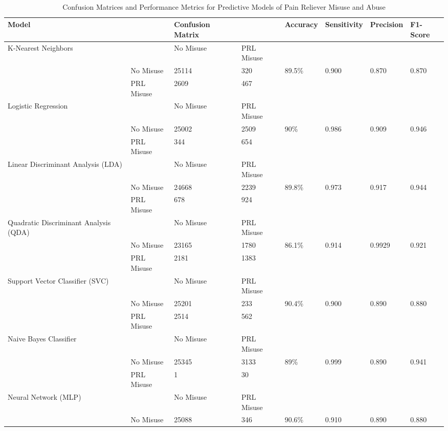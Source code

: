 \\\documentclass[sigconf]{acmart}
\begin{document}
 

 
 
\begin{table*}[ht]
  \caption{Confusion Matrices and Performance Metrics for Predictive Models of 
  Pain Reliever Misuse and Abuse}
  \label{tab:freq}
  \begin{tabular}{llllllll}
    \toprule
    Model& & Confusion Matrix & & Accuracy & Sensitivity & Precision & F1-Score \\
    \midrule
    K-Nearest Neighbors & & No Misuse & PRL Misuse &  &  &  & \\
     & No Misuse & 25114 & 320 & 89.5\% & 0.900 & 0.870 & 0.870 \\
     & PRL Misuse & 2609 & 467 &  &  &  & \\
    \midrule
    Logistic Regression & & No Misuse & PRL Misuse &  &  &  & \\
     & No Misuse & 25002 & 2509 & 90\% & 0.986 & 0.909 & 0.946 \\
     & PRL Misuse & 344 & 654 &  &  &  & \\
    \midrule
    Linear Discriminant Analysis (LDA) & & No Misuse & PRL Misuse &  &  &  & \\
     & No Misuse & 24668 & 2239 & 89.8\% & 0.973 & 0.917 & 0.944 \\
     & PRL Misuse & 678 & 924 &  &  &  & \\
    \midrule
    Quadratic Discriminant Analysis (QDA) & & No Misuse & PRL Misuse &  &  &  & \\
     & No Misuse & 23165 & 1780 & 86.1\% & 0.914 & 0.9929 & 0.921 \\
     & PRL Misuse & 2181 & 1383 &  &  &  & \\
    \midrule
    Support Vector Classifier (SVC) & & No Misuse & PRL Misuse &  &  &  & \\
     & No Misuse & 25201 & 233 & 90.4\% & 0.900 & 0.890 & 0.880 \\
     & PRL Misuse & 2514 & 562 &  &  &  & \\
    \midrule
    Naive Bayes Classifier & & No Misuse & PRL Misuse &  &  &  & \\
     & No Misuse & 25345 & 3133 & 89\% & 0.999 & 0.890 & 0.941 \\
     & PRL Misuse & 1 & 30 &  &  &  & \\
    \midrule
    Neural Network (MLP) & & No Misuse & PRL Misuse &  &  &  & \\
     & No Misuse & 25088 & 346 & 90.6\% & 0.910 & 0.890 & 0.880 \\

\end{tabular}
\end{table*}
\end{document}
